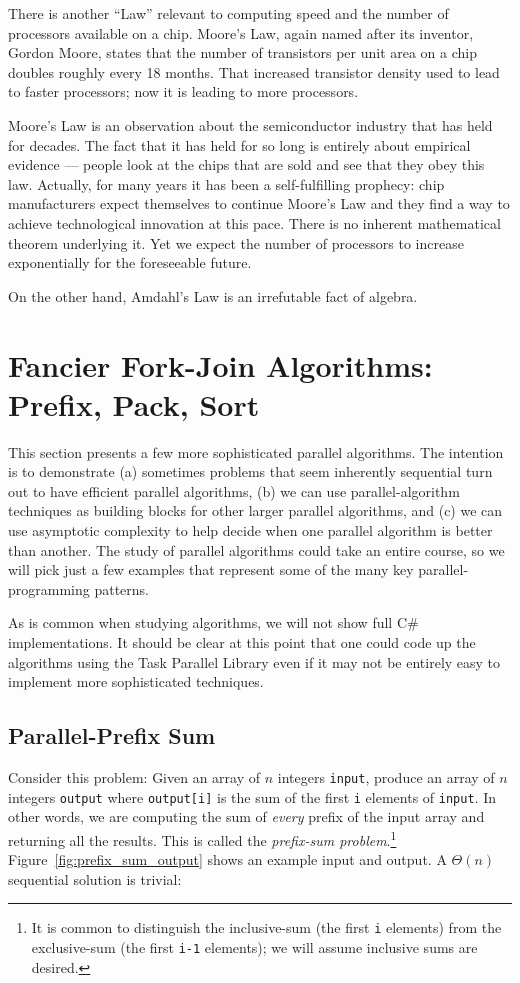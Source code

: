 \documentclass[10pt]{article}
\begin{document}
There is another ``Law'' relevant to computing speed and the number of
processors available on a chip.  Moore's Law, again named after its
inventor, Gordon Moore, states that the number of transistors per unit area on a
chip doubles roughly every 18 months.  That increased transistor
density used to lead to faster processors; now it is leading to more
processors.

Moore's Law is an observation about the semiconductor industry that
has held for decades.  The fact that it has held for so long is
entirely about empirical evidence --- people look at the chips that
are sold and see that they obey this law.  Actually, for many years it
has been a self-fulfilling prophecy: chip manufacturers expect
themselves to continue Moore's Law and they find a way to achieve
technological innovation at this pace.  There is no inherent
mathematical theorem underlying it.  Yet we expect the number of
processors to increase exponentially for the foreseeable future.

On the other hand, Amdahl's Law is an irrefutable fact of algebra.

\section{Fancier Fork-Join Algorithms: Prefix, Pack, Sort}
\label{sec:fancy-parallel}

This section presents a few more sophisticated parallel algorithms.
The intention is to demonstrate (a) sometimes problems that seem
inherently sequential turn out to have efficient parallel
algorithms, (b) we can use parallel-algorithm techniques as
building blocks for other larger parallel algorithms, and (c) we can
use asymptotic complexity to help decide when one parallel algorithm
is better than another.  The study of parallel algorithms
could take an entire course, so we will pick just a few examples
that represent some of the many key parallel-programming patterns.

As is common when studying algorithms, we will not show full C\#
implementations.  It should be clear at this point that one could code
up the algorithms using the Task Parallel Library even if it may not be
entirely easy to implement more sophisticated techniques.

\subsection{Parallel-Prefix Sum}

Consider this problem: Given an array of $n$ integers {\tt input},
produce an array of $n$ integers {\tt output} where {\tt output[i]} is
the sum of the first {\tt i} elements of {\tt input}.  In other words,
we are computing the sum of \emph{every} prefix of the input array and
returning all the results.  This is called the \emph{prefix-sum
  problem}.\footnote{It is common to distinguish the
  inclusive-sum (the first {\tt i} elements) from the exclusive-sum
  (the first {\tt i-1} elements); we will assume inclusive sums are
  desired.}  Figure~\ref{fig:prefix_sum_output} shows an example
input and output.
A $\Theta(n)$ sequential solution is trivial:
\end{document}

